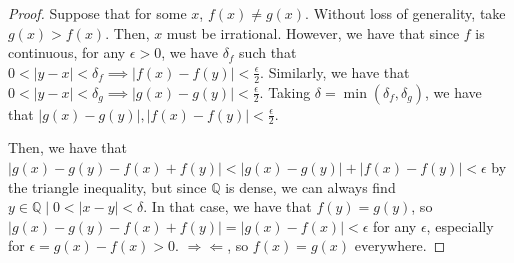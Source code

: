 \documentclass[12pt,letterpaper]{article}
\theoremstyle{definition}
\newcommand{\contra}{\Rightarrow\!\Leftarrow}
\newcommand{\R}{\mathbb{R}}
\newcommand{\Q}{\mathbb{Q}}
\begin{document}
\begin{proof}
  Suppose that for some $x$, $f(x) \neq g(x)$. Without loss of generality,
  take $g(x) > f(x)$. Then, $x$ must be irrational.
  However, we have that since $f$ is continuous, for any $\epsilon > 0$, we have
  $\delta_f$ such that $0 < |y-x| < \delta_f \implies |f(x) - f(y)| < \frac{\epsilon}{2}$.
  Similarly, we have that $0 < |y-x| < \delta_g \implies |g(x) - g(y)| <
  \frac{\epsilon}{2}$. Taking $\delta = \min(\delta_f, \delta_g)$, we have that $|g(x) -
  g(y)|, |f(x) - f(y)| < \frac{\epsilon}{2}$. 

  Then, we have that $|g(x) - g(y) - f(x) + f(y)| < |g(x) - g(y)| + |f(x) -
  f(y)| < \epsilon$ by the triangle inequality, but since $\Q$ is dense, we can
  always find $y \in \Q \mid 0 < |x-y| < \delta$. In that case, we have that
  $f(y) = g(y)$, so $|g(x) -g(y) - f(x) + f(y)| = |g(x) - f(x)| < \epsilon$ for
  any $\epsilon$, especially for $\epsilon = g(x)
  - f(x) > 0$. $\contra$, so $f(x) = g(x)$ everywhere. 

\end{proof}
\end{document}
